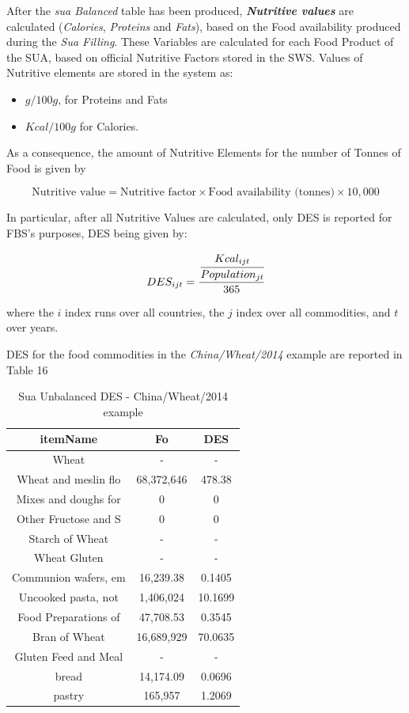 \documentclass[]{article}
\providecommand{\tightlist}{%
  \setlength{\itemsep}{0pt}\setlength{\parskip}{0pt}}
\begin{document}
After the \emph{sua Balanced} table has been produced,
\textbf{\emph{Nutritive values}} are calculated (\emph{Calories},
\emph{Proteins} and \emph{Fats}), based on the Food availability
produced during the \emph{Sua Filling}. These Variables are calculated
for each Food Product of the SUA, based on official Nutritive Factors
stored in the SWS. Values of Nutritive elements are stored in the system
as:

\begin{itemize}
\tightlist
\item
  \(g/100g\), for Proteins and Fats
\item
  \(Kcal/100g\) for Calories.
\end{itemize}

As a consequence, the amount of Nutritive Elements for the number of
Tonnes of Food is given by

\begin{equation}
\label{eq:Nutritive}
\text{Nutritive value} = \text{Nutritive factor} \times \text{Food availability (tonnes)} \times 10,000
\end{equation}

In particular, after all Nutritive Values are calculated, only DES is
reported for FBS's purposes, DES being given by:

\begin{equation}
\label{eq:des}
 DES_{ijt} = \cfrac{\cfrac{Kcal_{ijt}}{Population_{jt}}}{365}
\end{equation}

where the \(i\) index runs over all countries, the \(j\) index over all
commodities, and \(t\) over years.

DES for the food commodities in the \emph{China/Wheat/2014} example are
reported in Table 16

\begin{table}

\caption{\label{tab:t19}Sua Unbalanced DES - China/Wheat/2014 example}
\centering
\begin{tabular}[t]{c|c|c}
\hline
itemName & Fo & DES\\
\hline
Wheat & - & -\\
\hline
Wheat and meslin flo & 68,372,646 & 478.38\\
\hline
Mixes and doughs for & 0 & 0\\
\hline
Other Fructose and S & 0 & 0\\
\hline
Starch of Wheat & - & -\\
\hline
Wheat Gluten & - & -\\
\hline
Communion wafers, em & 16,239.38 & 0.1405\\
\hline
Uncooked pasta, not & 1,406,024 & 10.1699\\
\hline
Food Preparations of & 47,708.53 & 0.3545\\
\hline
Bran of Wheat & 16,689,929 & 70.0635\\
\hline
Gluten Feed and Meal & - & -\\
\hline
bread & 14,174.09 & 0.0696\\
\hline
pastry & 165,957 & 1.2069\\
\hline
\end{tabular}
\end{table}
\end{document}
